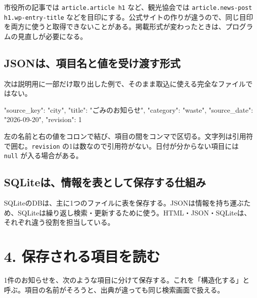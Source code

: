 \documentclass[a4paper,10pt]{ltjsarticle}
\begin{document}
市役所の記事では \nolinkurl{article.article h1} など、観光協会では \nolinkurl{article.news-post h1.wp-entry-title} などを目印にする。公式サイトの作りが違うので、同じ目印を両方に使うと取得できないことがある。掲載形式が変わったときは、プログラムの見直しが必要になる。


\subsection*{JSONは、項目名と値を受け渡す形式}

次は説明用に一部だけ取り出した例で、そのまま取込に使える完全なファイルではない。


\begin{Code}
{
  "source_key": "city",
  "title": "ごみのお知らせ",
  "category": "waste",
  "source_date": "2026-09-20",
  "revision": 1
}
\end{Code}

左の名前と右の値をコロンで結び、項目の間をコンマで区切る。文字列は引用符で囲む。\nolinkurl{revision} の1は数なので引用符がない。日付が分からない項目には \nolinkurl{null} が入る場合がある。


\subsection*{SQLiteは、情報を表として保存する仕組み}

SQLiteのDBは、主に1つのファイルに表を保存する。JSONは情報を持ち運ぶため、SQLiteは繰り返し検索・更新するために使う。HTML・JSON・SQLiteは、それぞれ違う役割を担当している。


\clearpage

\section*{4. 保存される項目を読む}

1件のお知らせを、次のような項目に分けて保存する。これを「構造化する」と呼ぶ。項目の名前がそろうと、出典が違っても同じ検索画面で扱える。
\end{document}
